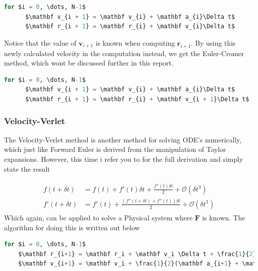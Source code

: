 \documentclass[10pt,showpacs,preprintnumbers,amsmath,amssymb,nofootinbib,aps,prl,twocolumn,groupedaddress,superscriptaddress,showkeys]{revtex4-1}
\begin{document}
    \begin{lstlisting}[mathescape=true, language=python, title=Forward Euler Algorithm]
  for $i = 0, \dots, N-1$
      $\mathbf v_{i + 1} = \mathbf v_{i} + \mathbf a_{i}\Delta t$
      $\mathbf r_{i + 1} = \mathbf r_{i} + \mathbf v_{i}\Delta t$
  \end{lstlisting}

  Notice that the value of $\mathbf v_{i+1}$ is known when computing $\mathbf r_{i+1}$. By using this newly calculated velocity in the computation instead, we get the Euler-Cromer method, which wont be discussed further in this report.

  \begin{lstlisting}[mathescape=true, language=python, title=Euler-Cromer Algorithm]
  for $i = 0, \dots, N-1$
      $\mathbf v_{i + 1} = \mathbf v_{i} + \mathbf a_{i}\Delta t$
      $\mathbf r_{i + 1} = \mathbf r_{i} + \mathbf v_{i + 1}\Delta t$
  \end{lstlisting}

  \subsubsection{Velocity-Verlet}
    The Velocity-Verlet method is another method for solving ODE's numerically, which just like Forward Euler is derived from the manipulation of Taylor expansions. However, this time i refer you to \cite{ode_lecture} for the full derivation and simply state the result

    \begin{align}
      \begin{split}
        f(t + \delta t) &= f(t) + f'(t)\delta t + \frac{f''(t)\delta t}{2} + \mathcal O(\delta t^3) \\
        f'(t + \delta t) &= f'(t) + \frac{\left( f''(t + \delta t) + f''(t) \right)\delta t}{2} + \mathcal O(\delta t^3)
      \end{split}
    \end{align}
    Which again, can be applied to solve a Physical system where $\mathbf F$ is known. The algorithm for doing this is written out below
  \begin{lstlisting}[mathescape=true, language=python, title=Velocity-Verlet Algorithm]
  for $i = 0, \dots, N-1$
    $\mathbf r_{i+1} = \mathbf r_i + \mathbf v_i \Delta t + \frac{1}{2}\mathbf a_i(\Delta t)^2$
    $\mathbf v_{i+1} = \mathbf v_i + \frac{1}{2}(\mathbf a_{i+1} + \mathbf a_i)\Delta t  $
  \end{lstlisting}
\end{document}

